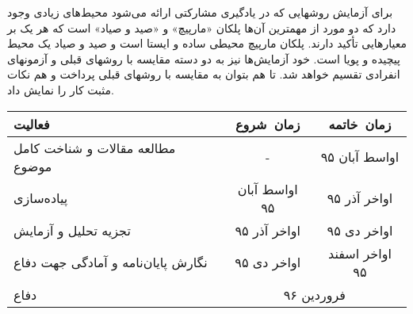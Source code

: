 \documentclass[12pt,a4paper]{article}
\newcommand{\renderref}[1] { \begingroup \let\clearpage\relax  \endgroup }
\begin{document}
برای آزمایش روشهایی که در یادگیری مشارکتی ارائه می‌شود محیط‌های زیادی وجود دارد که دو مورد از مهمترین آن‌ها
پلکان «مارپیچ» و «صید و صیاد» است که هر یک بر معیارهایی تأکید دارند. پلکان مارپیچ محیطی ساده و ایستا است و صید و صیاد یک
محیط پیچیده و پویا است. خود آزمایش‌ها نیز به دو دسته مقایسه با روشهای قبلی و آزمونهای انفرادی تقسیم خواهد شد. تا هم
بتوان به مقایسه با روشهای قبلی پرداخت و هم نکات مثبت کار را نمایش داد.
\newpage
{}
\begin{table}[h!]
\centering
\begin{tabular}{p{8cm}|c|c}
فعالیت & زمان\ شروع & زمان\ خاتمه
\\\hline
 مطالعه مقالات و شناخت کامل موضوع & - & اواسط آبان ۹۵
\\\hline
پیاده‌سازی & اواسط آبان ۹۵ & اواخر آذر ۹۵
\\\hline
تجزیه تحلیل و آزمایش & اواخر آذر ۹۵ & اواخر دی ۹۵
\\\hline
نگارش پایان‌نامه و آمادگی جهت دفاع & اواخر دی ۹۵ & اواخر اسفند ۹۵
\\\hline
دفاع & \multicolumn{2}{c}{فروردین ۹۶}
\end{tabular}
\end{table}

\renderref{reference}
\end{document}
